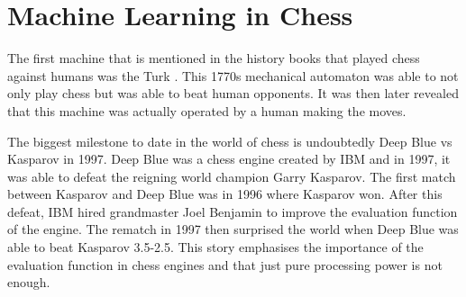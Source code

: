 \section{Machine Learning in Chess}

The first machine that is mentioned in the history books that played chess against humans was the Turk \cite{stephensMechanicalTurkShort2023}. This 1770s mechanical automaton was able to not only play chess but was able to beat human opponents. It was then later revealed that this machine was actually operated by a human making the moves. 

The biggest milestone to date in the world of chess is undoubtedly Deep Blue vs Kasparov in 1997. Deep Blue was a chess engine created by IBM and in 1997, it was able to defeat the reigning world champion Garry Kasparov. The first match between Kasparov and Deep Blue was in 1996 where Kasparov won. After this defeat, IBM hired grandmaster Joel Benjamin to improve the evaluation function of the engine. The rematch in 1997 then surprised the world when Deep Blue was able to beat Kasparov 3.5-2.5. This story emphasises the importance of the evaluation function in chess engines and that just pure processing power is not enough. 


